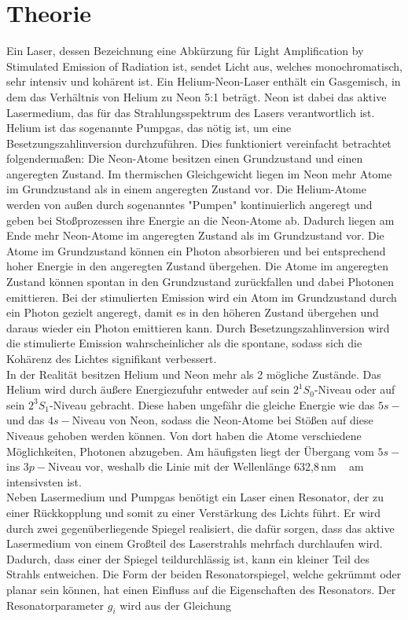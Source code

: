 \section{Theorie}
\label{sec:Theorie}


    Ein Laser, dessen Bezeichnung eine Abkürzung für Light Amplification by Stimulated Emission of Radiation ist,
    sendet Licht aus, welches monochromatisch, sehr intensiv und kohärent ist.
    Ein Helium-Neon-Laser enthält ein Gasgemisch, in dem das Verhältnis von Helium zu Neon 5:1 beträgt.
    Neon ist dabei das aktive Lasermedium, das für das Strahlungsspektrum des Lasers verantwortlich ist.
    Helium ist das sogenannte Pumpgas, das nötig ist, um eine Besetzungszahlinversion durchzuführen.
    Dies funktioniert vereinfacht betrachtet folgendermaßen:
    Die Neon-Atome besitzen einen Grundzustand und einen angeregten Zustand.
    Im thermischen Gleichgewicht liegen im Neon mehr Atome im Grundzustand als in einem angeregten Zustand vor.
    Die Helium-Atome werden von außen durch sogenanntes "Pumpen" kontinuierlich angeregt
    und geben bei Stoßprozessen ihre Energie an die Neon-Atome ab.
    Dadurch liegen am Ende mehr Neon-Atome im angeregten Zustand als im Grundzustand vor.
    Die Atome im Grundzustand können ein Photon absorbieren und bei entsprechend hoher Energie
    in den angeregten Zustand übergehen. Die Atome im angeregten Zustand können spontan in den Grundzustand zurückfallen
    und dabei Photonen emittieren.
    Bei der stimulierten Emission wird ein Atom im Grundzustand durch ein Photon gezielt angeregt, damit
    es in den höheren Zustand übergehen und daraus wieder ein Photon emittieren kann.
    Durch Besetzungszahlinversion wird die stimulierte Emission wahrscheinlicher als die spontane,
    sodass sich die Kohärenz des Lichtes signifikant verbessert.\\
    In der Realität besitzen Helium und Neon mehr als 2 mögliche Zustände.
    Das Helium wird durch äußere Energiezufuhr entweder auf sein $2^1S_0$-Niveau oder auf sein $2^3S_1$-Niveau
    gebracht. Diese haben ungefähr die gleiche Energie wie das $5s-$ und das $4s-$Niveau von Neon,
    sodass die Neon-Atome bei Stößen auf diese Niveaus gehoben werden können. Von dort haben die
    Atome verschiedene Möglichkeiten, Photonen abzugeben. Am häufigsten liegt der Übergang vom $5s-$ ins $3p-$Niveau
    vor, weshalb die Linie mit der Wellenlänge 632,8\,nm
    ~\cite{anleitungv61} am intensivsten ist. \\

    Neben Lasermedium und Pumpgas benötigt ein Laser einen Resonator, der zu einer Rückkopplung und somit
    zu einer Verstärkung des Lichts führt. Er wird durch zwei gegenüberliegende Spiegel realisiert, die
    dafür sorgen, dass das aktive Lasermedium von einem Großteil des Laserstrahls mehrfach durchlaufen wird.
    Dadurch, dass einer der Spiegel teildurchlässig ist, kann ein kleiner Teil des Strahls entweichen.
    Die Form der beiden Resonatorspiegel, welche gekrümmt oder planar sein können,
    hat einen Einfluss auf die Eigenschaften des Resonators.
    Der Resonatorparameter $g_i$ wird aus der Gleichung

